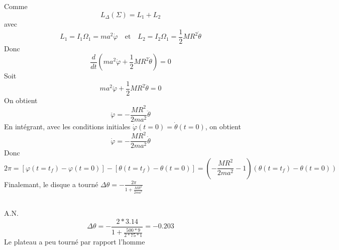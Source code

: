 \documentclass[a4paper,12pt]{book}
\begin{document}
\subsection{}
Comme 
$$
L_\Delta(\Sigma)=L_1+L_2 
$$
avec
$$
L_1=I_1\Omega_1=ma^2\dot{\varphi} \quad
\mbox{et} \quad
L_2=I_2\Omega_1=\frac{1}{2}MR^2\dot{\theta}
$$
Donc 
$$
\frac{d}{dt}\left(ma^2\dot{\varphi}+\frac{1}{2}MR^2\dot{\theta}\right)=0
$$
Soit
$$
ma^2\ddot{\varphi}+\frac{1}{2}MR^2\ddot{\theta}=0
$$
On obtient
$$
\ddot{\varphi}=-\frac{MR^2}{2ma^2}\ddot{\theta}
$$
En intégrant, avec les conditions initiales $\dot{\varphi}(t=0)=\dot{\theta}(t=0)$, on obtient
$$
\dot{\varphi}=-\frac{MR^2}{2ma^2}\dot{\theta}
$$
Donc 
$$
2\pi=[\varphi(t=t_f)-\varphi(t=0)]-[\theta(t=t_f)-\theta(t=0)]=\left(-\frac{MR^2}{2ma^2}-1\right)(\theta(t=t_f)-\theta(t=0))
$$
Finalemant, le disque a tourné $\boxed{\Delta \theta=-\frac{2\pi }{1+\frac{MR^2}{2ma^2}}}$
\subsection{}
A.N. 
$$
\boxed{\Delta \theta=-\frac{2*3.14}{1+\frac{500*9}{2*75*1}}=-0.203}
$$
Le plateau a peu tourné par rapport l'homme
\end{document}

